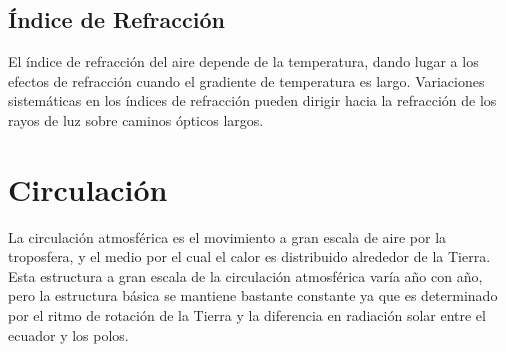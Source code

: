 \documentclass{article} %
\begin{document}
	\subsection{Índice de Refracción}
   	El índice de refracción del aire depende de la temperatura, dando lugar a los efectos de refracción cuando el gradiente de temperatura es largo. Variaciones sistemáticas en los índices de refracción pueden dirigir hacia la refracción de los rayos de luz sobre caminos ópticos largos.

\section{Circulación}
    La circulación atmosférica es el movimiento a gran escala de aire por la troposfera, y el medio por el cual el calor es distribuido alrededor de la Tierra. Esta estructura a gran escala de la circulación atmosférica varía año con año, pero la estructura básica se mantiene bastante constante ya que es determinado por el ritmo de rotación de la Tierra y la diferencia en radiación solar entre el ecuador y los polos.
\end{document}
